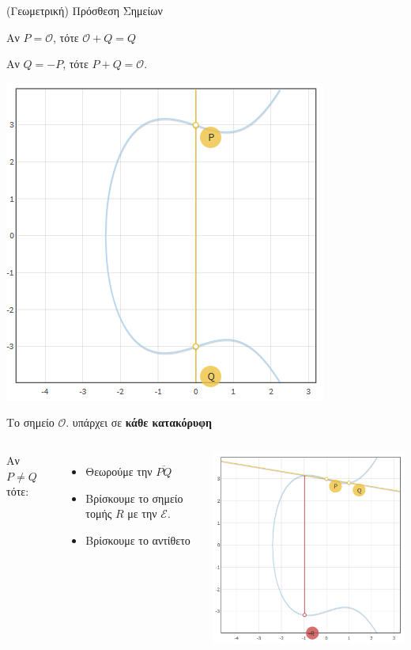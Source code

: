 \documentclass[handout]{beamer}
\begin{document}
\begin{frame}[allowframebreaks]{(Γεωμετρική) Πρόσθεση Σημείων}
 
Αν $P=\mathcal O$, τότε $\mathcal O+Q=Q$  

Αν $Q=-P$, τότε  $P+Q=\mathcal O$.  
\begin{center}
\includegraphics[scale=0.4]{add_opp.png} 
\end{center}

Το σημείο $\mathcal O$. υπάρχει σε \textbf{κάθε κατακόρυφη}
\framebreak

\begin{columns}
Αν $P \neq Q$ τότε:
\begin{itemize}
\item Θεωρούμε την $\overline{PQ}$
\item Βρίσκουμε το σημείο τομής $R$ με την $\mathcal{E}$.
\item Βρίσκουμε το αντίθετο
\end{itemize}
\begin{center}
\includegraphics[scale=0.5]{add.png} 
\end{center}
\end{columns}


\end{frame}
\end{document}

